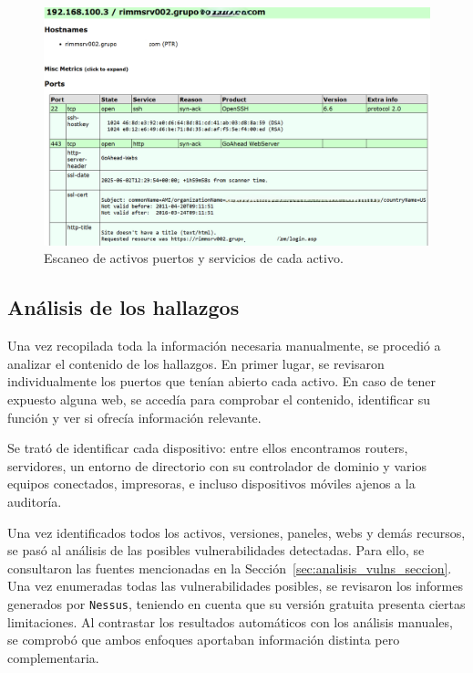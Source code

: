\documentclass[a4paper, 11pt]{article}
\begin{document}
\begin{figure}[H]
    \centering
    \includegraphics[width=1\textwidth]{images/puertos_nmap.png}
    \caption{Escaneo de activos puertos y servicios de cada activo.}
    \label{fig:nmap_ports}
\end{figure}


\subsection*{Análisis de los hallazgos}

Una vez recopilada toda la información necesaria manualmente, se procedió a analizar el contenido de los hallazgos. En primer lugar, se revisaron individualmente los puertos que tenían abierto cada activo. En caso de tener expuesto alguna web, se accedía para comprobar el contenido, identificar su función y ver si ofrecía información relevante. 

Se trató de identificar cada dispositivo: entre ellos encontramos routers, servidores, un entorno de directorio con su controlador de dominio y varios equipos conectados, impresoras, e incluso dispositivos móviles ajenos a la auditoría.

Una vez identificados todos los activos, versiones, paneles, webs y demás recursos, se pasó al análisis de las posibles vulnerabilidades detectadas. Para ello, se consultaron las fuentes mencionadas en la Sección~\ref{sec:analisis_vulns_seccion}. Una vez enumeradas todas las vulnerabilidades posibles, se revisaron los informes generados por \texttt{Nessus}, teniendo en cuenta que su versión gratuita presenta ciertas limitaciones. Al contrastar los resultados automáticos con los análisis manuales, se comprobó que ambos enfoques aportaban información distinta pero complementaria.
\end{document}
